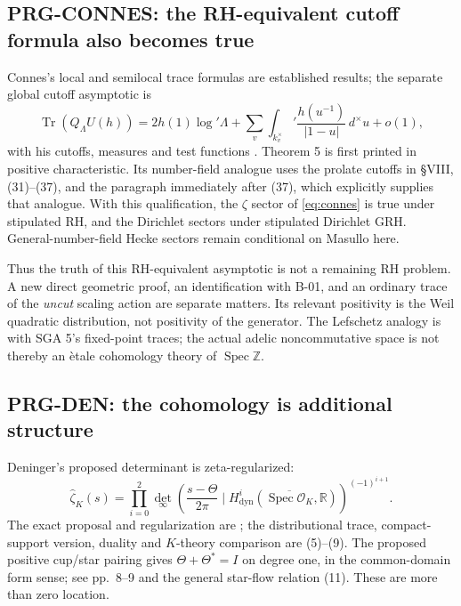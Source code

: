 \documentclass[11pt,a4paper]{article}
\newcommand{\Tr}{\operatorname{Tr}}
\newcommand{\Spec}{\operatorname{Spec}}
\newcommand{\R}{\mathbb R}
\newcommand{\Z}{\mathbb Z}
\newcommand{\fid}[1]{\textsf{#1}}
\begin{document}
\subsection{PRG-CONNES: the RH-equivalent cutoff formula also becomes true}
Connes's local and semilocal trace formulas are established results; the separate global cutoff asymptotic is
\begin{equation}\label{eq:connes}
 \Tr(Q_\Lambda U(h))=2h(1)\log'\Lambda+
 \sum_v\int_{k_v^\times}'\frac{h(u^{-1})}{|1-u|}\,d^\times u+o(1),
\end{equation}
with his cutoffs, measures and test functions \cite[\S VIII, (16), Theorem 5]{connes}. Theorem 5 is first printed in positive characteristic. Its number-field analogue uses the prolate cutoffs in \S VIII, (31)--(37), and the paragraph immediately after (37), which explicitly supplies that analogue. With this qualification, the $\zeta$ sector of \eqref{eq:connes} is true under stipulated RH, and the Dirichlet sectors under stipulated Dirichlet GRH. General-number-field Hecke sectors remain conditional on Masullo here.

Thus the truth of this RH-equivalent asymptotic is not a remaining RH problem. A new direct geometric proof, an identification with \fid{B-01}, and an ordinary trace of the \emph{uncut} scaling action are separate matters. Its relevant positivity is the Weil quadratic distribution, not positivity of the generator. The Lefschetz analogy is with SGA 5's fixed-point traces; the actual adelic noncommutative space is not thereby an \`etale cohomology theory of $\Spec\Z$.

\subsection{PRG-DEN: the cohomology is additional structure}
Deninger's proposed determinant is zeta-regularized:
\[
 \widehat\zeta_K(s)=\prod_{i=0}^2
 \det_\infty\!\left(\frac{s-\Theta}{2\pi}\mid
 H^i_{\mathrm{dyn}}(\overline{\Spec\mathcal O_K},\R)\right)^{(-1)^{i+1}}.
\]
The exact proposal and regularization are \cite[\S3, (2)--(3)]{deninger}; the distributional trace, compact-support version, duality and $K$-theory comparison are (5)--(9). The proposed positive cup/star pairing gives $\Theta+\Theta^*=I$ on degree one, in the common-domain form sense; see pp.~8--9 and the general star-flow relation (11). These are more than zero location.
\end{document}
